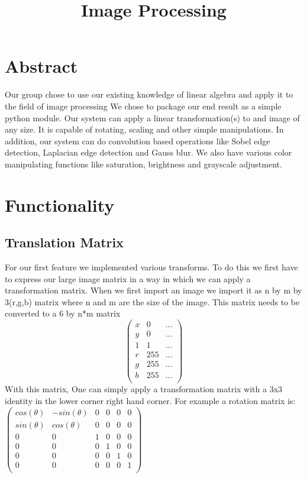 \documentclass[11pt]{article}
\title{\textbf{Image Processing}}
\author{}
\date{}
\begin{document}
\maketitle

\section{Abstract}
Our group chose to use our existing knowledge of linear algebra and apply it to the field of image processing We chose to package our end result as a simple python module. Our system can apply a linear transformation(s) to and image of any size. It is capable of rotating, scaling and other simple manipulations. In addition, our system can do convolution based operations like Sobel edge detection, Laplacian edge detection and Gauss blur. We also have various color manipulating functions like saturation, brightness and grayscale adjustment.

\section{Functionality}
\subsection{Translation Matrix}
For our first feature we implemented various transforms. To do this we first have to express our large image matrix in a way in which we can apply a transformation matrix. When we first import an image we import it as n by m by 3(r,g,b) matrix where n and m are the size of the image. This matrix needs to be converted to a 6 by n*m matrix
$$\begin{pmatrix}
	x & 0 & ...\\
	y & 0 & ...\\
	1 & 1 & ...\\
	r &  255 & ...\\
	g & 255 & ...\\
	b & 255 & ...\\
\end{pmatrix}$$
 With this matrix, One can simply apply a transformation matrix with a 3x3 identity in the lower corner right hand corner. For example a rotation matrix is:
 $\begin{pmatrix} 
	cos(\theta) & -sin(\theta) & 0 & 0 & 0 & 0\\
	sin(\theta) & cos(\theta) & 0 & 0 & 0 & 0\\
	0 & 0 & 1 & 0 & 0 & 0\\
	0 & 0 & 0 & 1 & 0 & 0\\
	0 & 0 & 0 & 0 & 1 & 0\\
	0 & 0 & 0 & 0 & 0 & 1\\
\end{pmatrix}$
\end{document}
